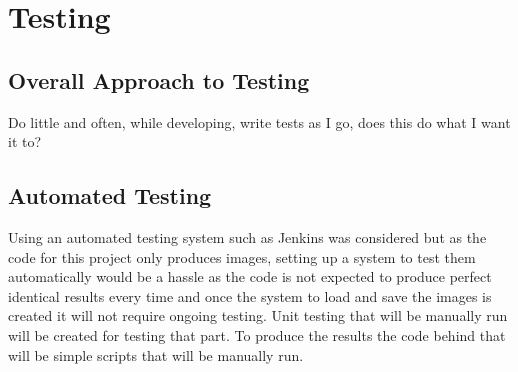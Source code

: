 \section{Testing}

\subsection{Overall Approach to Testing}

Do little and often, while developing, write tests as I go, does this do what I want it to?

\subsection{Automated Testing}
Using an automated testing system such as Jenkins was considered but as the code for this project only produces images,  setting up a system to test them automatically would be a hassle as the code is not expected to produce perfect identical results every time and once the system to load and save the images is created it will not require ongoing testing. Unit testing that will be manually run will be created for testing that part. To produce the results the code behind that will be simple scripts that will be manually run.


